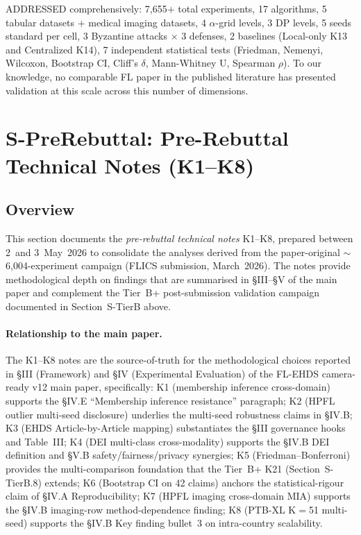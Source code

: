 \documentclass[conference]{IEEEtran}
\begin{document}
ADDRESSED comprehensively: 7{,}655$+$ total experiments, 17 algorithms, 5 tabular datasets $+$ medical imaging datasets, 4 $\alpha$-grid levels, 3 DP levels, 5 seeds standard per cell, 3 Byzantine attacks $\times$ 3 defenses, 2 baselines (Local-only K13 and Centralized K14), 7 independent statistical tests (Friedman, Nemenyi, Wilcoxon, Bootstrap CI, Cliff's $\delta$, Mann-Whitney U, Spearman $\rho$). To our knowledge, no comparable FL paper in the published literature has presented validation at this scale across this number of dimensions.

\section{S-PreRebuttal: Pre-Rebuttal Technical Notes (K1--K8)}
\label{sec:pre_rebuttal}
\label{app:pre_rebuttal}

\subsection*{Overview}
\label{sec:pre_rebuttal_overview}

This section documents the \emph{pre-rebuttal technical notes} K1--K8, prepared between 2~and 3~May~2026 to consolidate the analyses derived from the paper-original $\sim$6{,}004-experiment campaign (FLICS submission, March~2026). The notes provide methodological depth on findings that are summarised in §III--§V of the main paper and complement the Tier~B+ post-submission validation campaign documented in Section~S-TierB above.

\paragraph{Relationship to the main paper.} The K1--K8 notes are the source-of-truth for the methodological choices reported in §III (Framework) and §IV (Experimental Evaluation) of the FL-EHDS camera-ready v12 main paper, specifically: K1 (membership inference cross-domain) supports the §IV.E ``Membership inference resistance'' paragraph; K2 (HPFL outlier multi-seed disclosure) underlies the multi-seed robustness claims in §IV.B; K3 (EHDS Article-by-Article mapping) substantiates the §III governance hooks and Table~III; K4 (DEI multi-class cross-modality) supports the §IV.B DEI definition and §V.B safety/fairness/privacy synergies; K5 (Friedman--Bonferroni) provides the multi-comparison foundation that the Tier~B+ K21 (Section~S-TierB.8) extends; K6 (Bootstrap CI on 42 claims) anchors the statistical-rigour claim of §IV.A Reproducibility; K7 (HPFL imaging cross-domain MIA) supports the §IV.B imaging-row method-dependence finding; K8 (PTB-XL K$=$51 multi-seed) supports the §IV.B Key finding bullet~3 on intra-country scalability.
\end{document}
